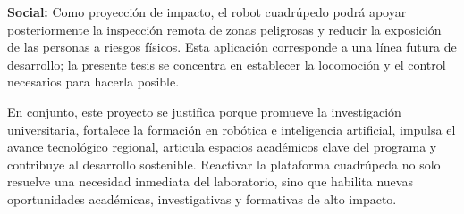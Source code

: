 \textbf{Social:} Como proyección de impacto, el robot cuadrúpedo podrá apoyar posteriormente la inspección remota de zonas peligrosas y reducir la exposición de las personas a riesgos físicos. Esta aplicación corresponde a una línea futura de desarrollo; la presente tesis se concentra en establecer la locomoción y el control necesarios para hacerla posible.\

En conjunto, este proyecto se justifica porque promueve la investigación universitaria, fortalece la formación en robótica e inteligencia artificial, impulsa el avance tecnológico regional, articula espacios académicos clave del programa y contribuye al desarrollo sostenible. Reactivar la plataforma cuadrúpeda no solo resuelve una necesidad inmediata del laboratorio, sino que habilita nuevas oportunidades académicas, investigativas y formativas de alto impacto.


